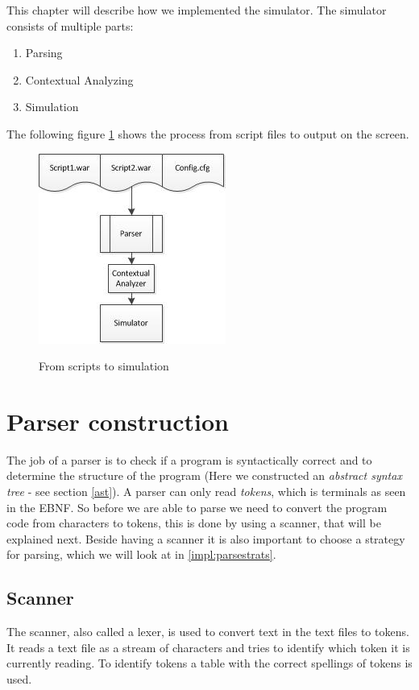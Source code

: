This chapter will describe how we implemented the simulator. The simulator consists of multiple parts: \\
\begin{enumerate}
	\item Parsing
	\item Contextual Analyzing
	\item Simulation
\end{enumerate}

The following figure \ref{fig:script_to_simu} shows the process from script files to output on the screen.

\begin{figure}[H]
\centering
\includegraphics[scale=1.2]{rapport/6/figures/script_to_simu}
\label{fig:script_to_simu}
\caption{From scripts to simulation}
\end{figure}

\section{Parser construction}
	The job of a parser is to check if a program is syntactically correct and 
	to determine the structure of the program (Here we constructed an {\it abstract syntax tree} - see section \ref{ast}).
	A parser can only read {\it tokens}, which is terminals as seen in the EBNF. So before we are able to parse we need to convert 
	the program code from characters to tokens, this is done by using a scanner, that will be explained next. Beside having a scanner it is 
	also important to choose a strategy for parsing, which we will look at in \ref{impl:parsestrats}.
	
	\subsection{Scanner}
		The scanner, also called a lexer, is used to convert text in the text files to tokens. 
		It reads a text file as a stream of characters and tries to identify which token it is currently reading.
		To identify tokens a table with the correct spellings of tokens is used.			 
		
